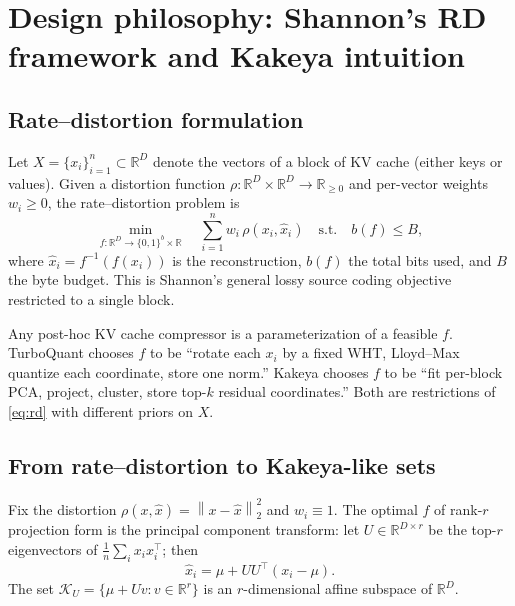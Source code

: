 \documentclass[11pt,a4paper]{article}
\theoremstyle{definition}
\theoremstyle{plain}
\newcommand{\R}{\mathbb{R}}
\newcommand{\norm}[1]{\left\lVert#1\right\rVert}
\begin{document}
\section{Design philosophy: Shannon's RD framework and Kakeya intuition}
\label{sec:framework}

\subsection{Rate--distortion formulation}
Let $X = \{x_i\}_{i=1}^n \subset \R^D$ denote the vectors of a block of KV cache (either keys or values). Given a distortion function $\rho: \R^D \times \R^D \to \R_{\geq 0}$ and per-vector weights $w_i \geq 0$, the rate--distortion problem is
\begin{equation}
\label{eq:rd}
\min_{f: \R^D \to \{0,1\}^b \times \R} \quad \sum_{i=1}^n w_i \, \rho(x_i, \hat{x}_i)
\quad \text{s.t.} \quad b(f) \leq B,
\end{equation}
where $\hat{x}_i = f^{-1}(f(x_i))$ is the reconstruction, $b(f)$ the total bits used, and $B$ the byte budget. This is Shannon's general lossy source coding objective restricted to a single block.

Any post-hoc KV cache compressor is a parameterization of a feasible $f$. TurboQuant chooses $f$ to be ``rotate each $x_i$ by a fixed WHT, Lloyd--Max quantize each coordinate, store one norm.'' Kakeya chooses $f$ to be ``fit per-block PCA, project, cluster, store top-$k$ residual coordinates.'' Both are restrictions of \eqref{eq:rd} with different priors on $X$.

\subsection{From rate--distortion to Kakeya-like sets}
Fix the distortion $\rho(x, \hat{x}) = \norm{x - \hat{x}}_2^2$ and $w_i \equiv 1$. The optimal $f$ of rank-$r$ projection form is the principal component transform: let $U \in \R^{D \times r}$ be the top-$r$ eigenvectors of $\tfrac{1}{n}\sum_i x_i x_i^\top$; then
\begin{equation}
\label{eq:pca-skeleton}
\hat{x}_i = \mu + U U^\top (x_i - \mu).
\end{equation}
The set $\mathcal{K}_U = \{\mu + U v : v \in \R^r\}$ is an $r$-dimensional affine subspace of $\R^D$.
\end{document}
